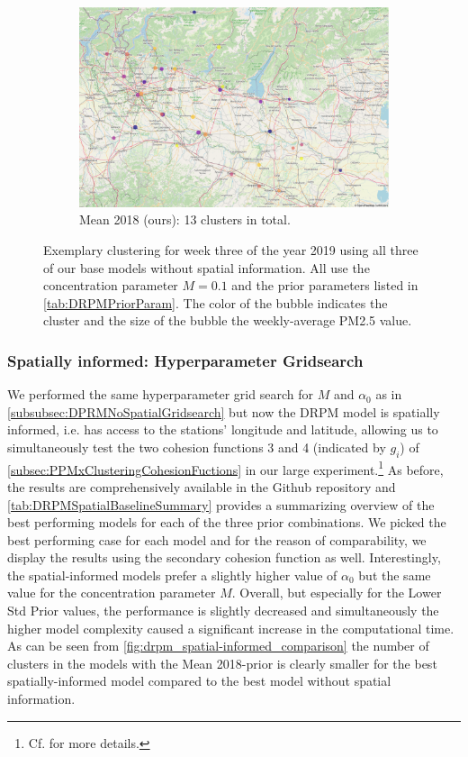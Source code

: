 \documentclass[12pt,a4paper]{article}
\begin{document}
\begin{figure}
\begin{subfigure}[b]{0.49\textwidth}
         \includegraphics[width=\textwidth]{./imgs/drpm/drpm_base_clustering_mean_prev_year.png}
         \caption{Mean 2018 (ours): 13 clusters in total.}
         \label{fig:DRPMMeanPreviousYear}
     \end{subfigure}
        \caption{Exemplary clustering for week three of the year 2019 using all three of
        our base models without spatial information. All use the concentration parameter
        $M=0.1$ and the prior parameters listed in \cref{tab:DRPMPriorParam}. The color of
        the bubble indicates the cluster and the size of the bubble the weekly-average PM2.5 value.}
        \label{fig:DRPMClusteringBaseModels}
\end{figure}

\subsubsection{Spatially informed: Hyperparameter Gridsearch}
We performed the same hyperparameter grid search for $M$ and $\alpha_0$ as in \cref{subsubsec:DPRMNoSpatialGridsearch} but now the
DRPM model is spatially informed, i.e. has access to the stations' longitude and latitude, allowing us to simultaneously 
test the two cohesion functions 3 and 4 (indicated by $g_i$) of \cref{subsec:PPMxClusteringCohesionFuctions} in our large experiment.\footnote{Cf.
\cite[Section 4.2]{Page2021-Temporal} for more details.}
As before, the results are comprehensively available in the Github repository and \cref{tab:DRPMSpatialBaselineSummary}
provides a summarizing overview of
the best performing models for each of the three prior combinations. We picked the best performing case for each model and
for the reason of comparability, we display the results using the secondary cohesion function as well. Interestingly,
the spatial-informed models prefer a slightly higher value of $\alpha_0$ but the same value for the concentration parameter
$M$. Overall, but especially for the Lower Std Prior values, the performance is slightly decreased and simultaneously
the higher model complexity caused a significant increase in the computational time. As can be seen from \ref{fig:drpm_spatial-informed_comparison} the number of clusters in the models with the Mean 2018-prior is clearly smaller for the best spatially-informed model compared to the best model without spatial information.
\end{document}
